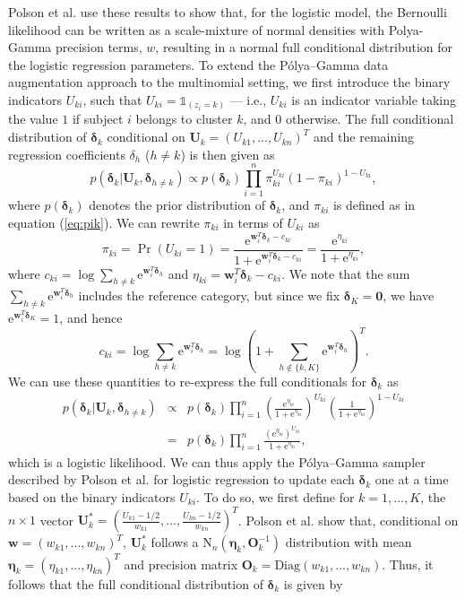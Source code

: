 \documentclass[useAMS,referee]{biom}
\begin{document}
Polson et al. use these results to show that, for the logistic model, the Bernoulli likelihood can be written as a scale-mixture of normal densities with Polya-Gamma precision terms, $w$, resulting in a normal full conditional distribution for the logistic regression parameters. To extend the P\'olya--Gamma data augmentation approach to the multinomial setting, we first introduce the binary indicators $U_{ki}$, such that $U_{ki} = \mathds{1}_{(z_i = k)}$ --- i.e., $U_{ki}$ is an indicator variable taking the value $1$ if subject $i$ belongs to cluster $k$, and $0$ otherwise. The full conditional distribution of $\boldsymbol\delta_k$ conditional on $\mathbf{U}_k = (U_{k1},...,U_{kn})^T$ and the remaining regression coefficients $\delta_h$ ($h \ne k$) is then given as  $$p(\boldsymbol\delta_k|\mathbf{U}_k,\boldsymbol\delta_{h \ne k}) \propto p(\boldsymbol\delta_k) \prod_{i = 1}^{n} \pi_{ki}^{U_{ki}}(1-\pi_{ki})^{1-U_{ki}},$$
where $p(\boldsymbol\delta_k)$ denotes the prior distribution of $\boldsymbol\delta_k$, and $\pi_{ki}$ is defined as in equation (\ref{eq:pik}). We can rewrite $\pi_{ki}$ in terms of $U_{ki}$ as
$$\pi_{ki} = \Pr(U_{ki} = 1) = \frac{\text{e}^{\mathbf{w}_i^T \boldsymbol\delta_k - {c}_{ki}}}{1 + \text{e}^{\mathbf{w}_i^T \boldsymbol\delta_k - {c}_{ki}}} = \frac{\text{e}^{\eta_{ki}}}{1 + \text{e}^{\eta_{ki}}},$$
where ${c}_{ki} = \log \sum_{h \ne k} \text{e}^{\mathbf{w}_i^T \boldsymbol\delta_{h}}$ and $\eta_{ki} = \mathbf{w}_i^T \boldsymbol\delta_k - {c}_{ki}$. We note that the sum $\sum_{h \ne k} \text{e}^{\mathbf{w}_i^T \boldsymbol\delta_{h}}$ includes the reference category, but since we fix $\boldsymbol\delta_K = \mathbf{0}$, we have $\text{e}^{\mathbf{w}_i^T \boldsymbol\delta_K} = 1$, and hence
$$c_{ki} = \log \sum_{h \ne k} \text{e}^{\mathbf{w}_i^T \boldsymbol\delta_{h}} = \log \left ( 1 + \sum_{h \notin \{k,K \}} \text{e}^{\mathbf{w}_i^T \boldsymbol\delta_{h}} \right )^T.$$
We can use these quantities to re-express the full conditionals for $\boldsymbol\delta_k$ as
\begin{eqnarray}
	p(\boldsymbol\delta_k|\mathbf{U}_k,\boldsymbol\delta_{h \ne k}) &\propto& p(\boldsymbol\delta_k) \prod_{i = 1}^{n} \left (\frac{\text{e}^{\eta_{ki}}}{1 + \text{e}^{\eta_{ki}}} \right )^{U_{ki}} \left (\frac{1}{1 + \text{e}^{\eta_{ki}}} \right )^{1-U_{ki}} \nonumber\\ &=& p(\boldsymbol\delta_k) \prod_{i = 1}^n \frac{(\text{e}^{\eta_{ki}})^{U_{ki}}}{1 + \text{e}^{\eta_{ki}}}, \label{eq:pglogit}
\end{eqnarray}
which is a logistic likelihood. We can thus apply the P\'olya--Gamma sampler described by Polson et al. for logistic regression to update each $\boldsymbol\delta_k$ one at a time based on the binary indicators $U_{ki}$. To do so, we first define for $k = 1,...,K$, the $n \times 1$ vector $\mathbf{U}^*_{k} = \left( \frac{U_{k1}-1/2}{w_{k1}},...,\frac{U_{kn}-1/2}{w_{kn}} \right )^T$. Polson et al. show that, conditional on $\boldsymbol{w} = (w_{k1},...,w_{kn})^T$, $\mathbf{U}^*_{k}$ follows a $\text{N}_n (\boldsymbol\eta_k,\mathbf{O}_k^{-1})$ distribution with mean $\boldsymbol\eta_k = (\eta_{k1},...,\eta_{kn})^T$ and precision matrix $\mathbf{O}_k = \text{Diag}(w_{k1},...,w_{kn})$. Thus, it follows that the full conditional distribution of $\boldsymbol\delta_k$ is given by 
\end{document}
